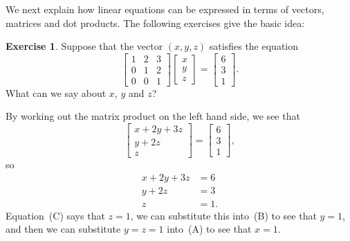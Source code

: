 \documentclass[a4paper]{book}
\renewcommand{\:}{\colon}
\theoremstyle{definition}
\newtheorem{exercise}[theorem]{Exercise}
\renewenvironment{solution}{\SolutionInline}{\endSolutionInline}
\begin{document}
We next explain how linear equations can be expressed in terms of
vectors, matrices and dot products.  The following exercises give the
basic idea:
\begin{exercise}
 Suppose that the vector $(x,y,z)$ satisfies the equation
 \[ \begin{bmatrix} 1&2&3 \\ 0&1&2 \\ 0&0&1 \end{bmatrix} 
    \begin{bmatrix} x \\ y \\ z \end{bmatrix}
     = \begin{bmatrix} 6 \\ 3 \\ 1 \end{bmatrix}.
 \]
 What can we say about $x$, $y$ and $z$?
\end{exercise}
\begin{solution}
 By working out the matrix product on the left hand side, we see that
 \[ \begin{bmatrix} x+2y+3z \\ y+2z \\ z \end{bmatrix}
    = \begin{bmatrix} 6 \\ 3 \\ 1 \end{bmatrix},
 \]
 so
 \begin{align*}
  x + 2y + 3z &= 6  \tag{A}\\
       y + 2z &= 3  \tag{B}\\
            z &= 1. \tag{C}
 \end{align*}
 Equation~(C) says that $z=1$, we can substitute this into~(B) to see
 that $y=1$, and then we can substitute $y=z=1$ into~(A) to see that
 $x=1$.
\end{solution}
\end{document}
